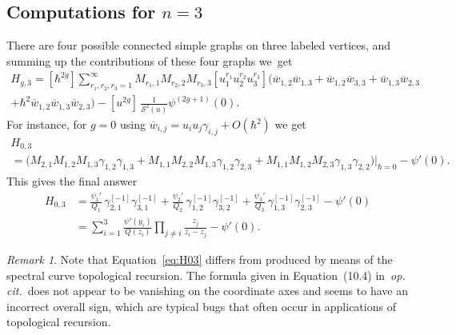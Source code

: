 \documentclass[11pt]{article}
\let\mathcal\mathscr
\theoremstyle{plain}
\theoremstyle{definition}
\theoremstyle{remark}
\newtheorem{remark}[theorem]{Remark}
\newcommand{\cS}{\mathcal{S}}
\begin{document}
\subsection{Computations for \texorpdfstring{$n=3$}{n=3}}
There are four possible connected simple graphs on three labeled vertices, and summing up the contributions of these four graphs we~get
\begin{multline*}
H_{g,3} =[\hbar^{2g}]\sum_{r_1,r_2,r_3=1}^\infty M_{r_1,1} M_{r_2,2} M_{r_3,3}[u_1^{r_1}u_2^{r_2}u_3^{r_3}]
\bigl(\overline w_{1,2}\overline w_{1,3}+\overline w_{1,2}\overline w_{3,3}+\overline w_{1,3}\overline w_{2,3}
\\
+\hbar^2 \overline w_{1,2}\overline w_{1,3}\overline w_{2,3}\bigr)
- [u^{2g}]\,\frac1{\cS^2(u)}\psi^{(2g+1)}(0).
\end{multline*}
For instance, for $g=0$ using $\overline w_{i,j}=u_iu_j\gamma_{i,j}+O(\hbar^2)$ we get\vspace*{-5pt}
\begin{multline*}
H_{0,3}\\
=\bigl(M_{2,1}M_{1,2}M_{1,3}\gamma_{1,2}\gamma_{1,3}+
M_{1,1}M_{2,2}M_{1,3}\gamma_{1,2}\gamma_{2,3}+
M_{1,1}M_{1,2}M_{2,3}\gamma_{1,3}\gamma_{2,2}\bigr)\big|_{\hbar=0}-\psi'(0).
\end{multline*}
This gives the final answer
\begin{equation}\label{eq:H03}
\begin{aligned}
H_{0,3}&=
\frac{\psi_1'}{Q_1}\,\gamma_{2,1}^{[-1]}\gamma_{3,1}^{[-1]}
+\frac{\psi_2'}{Q_2}\,\gamma_{1,2}^{[-1]}\gamma_{3,2}^{[-1]}
+\frac{\psi_3'}{Q_3}\,\gamma_{1,3}^{[-1]}\gamma_{2,3}^{[-1]}
-\psi'(0)\\
&=
\sum_{i=1}^3\frac{\psi'(y_i)}{Q(z_i)}\prod_{j\ne i}\frac{z_j}{z_i-z_j}-\psi'(0).
\end{aligned}
\end{equation}
\begin{remark} Note that Equation~\eqref{eq:H03} differs from \cite[Prop.\,10.2 \& Eq.\,(10.4)]{ACEH-2} produced by means of the spectral curve topological recursion. The formula given in Equation~(10.4) in~\emph{op.\,cit.}\ does not appear to be vanishing on the coordinate axes and seems to have an incorrect overall sign, which are typical bugs that often occur in applications of topological recursion.
\end{remark}
\end{document}
